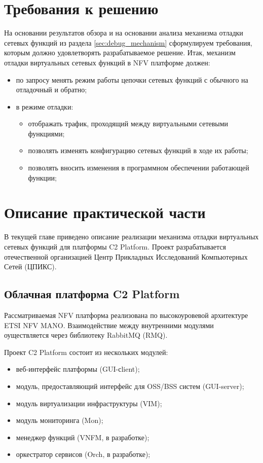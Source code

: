 \documentclass[oneside,final,14pt,a4paper]{extreport}
\begin{document}
\chapter{Требования к решению}
\label{sec:platform_requirements}
На основании результатов обзора и на основании анализа механизма отладки сетевых функций из раздела \ref{sec:debug_mechanism} сформулируем требования, которым должно удовлетворять разрабатываемое решение. Итак, механизм отладки виртуальных сетевых функций в NFV платформе должен:
\begin{itemize}
    \item по запросу менять режим работы цепочки сетевых функций с обычного на отладочный и обратно;
    \item в режиме отладки:
    \begin{itemize}
        \item отображать трафик, проходящий между виртуальными сетевыми функциями;
        \item позволять изменять конфигурацию сетевых функций в ходе их работы;
        \item позволять вносить изменения в программном обеспечении работающей функции;
    \end{itemize}
\end{itemize}





\chapter{Описание практической части}
\label{chap:practice}
В текущей главе приведено описание реализации механизма отладки виртуальных сетевых функций для платформы C2 Platform\cite{bib:c2_platform}. Проект разрабатывается отечественной организацией Центр Прикладных Исследований Компьютерных Сетей (ЦПИКС).

\section{Облачная платформа C2 Platform}
\label{sec:c2-platform-description}
Рассматриваемая NFV платформа реализована по высокоуровевой архитектуре ETSI NFV MANO. Взаимодействие между внутренними модулями оуществляется через библиотеку RabbitMQ (RMQ). \cite{bib:rabbitmq}

Проект C2 Platform состоит из нескольких модулей:
\begin{itemize}
	\item веб-интерфейс платформы (GUI-сlient);
	\item модуль, предоставляющий интерфейс для OSS/BSS систем (GUI-server);
	\item модуль виртуализации инфраструктуры (VIM);
	\item модуль мониторинга (Mon);
	\item менеджер функций (VNFM, в разработке);
	\item оркестратор сервисов (Orch, в разработке);
\end{itemize}
\end{document}
